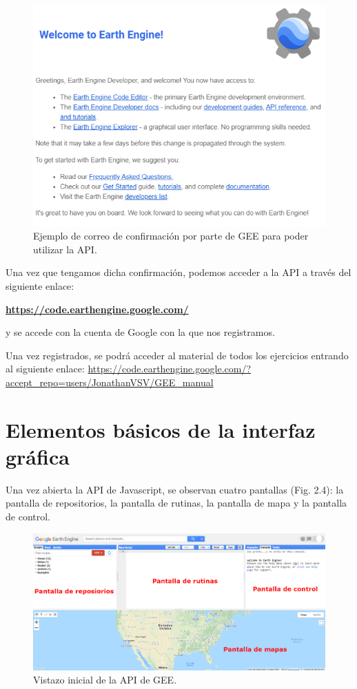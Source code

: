 \documentclass[
  12pt,
  letterpaper,
  twoside]{book}
\begin{document}
\begin{figure}[btp]

{\centering \includegraphics[width=0.6\linewidth]{Img/correo} 

}

\caption{Ejemplo de correo de confirmación por parte de GEE para poder utilizar la API.}\label{fig:unnamed-chunk-4}
\end{figure}

Una vez que tengamos dicha confirmación, podemos acceder a la API a través del siguiente enlace:

\textbf{\url{https://code.earthengine.google.com/}}

y se accede con la cuenta de Google con la que nos registramos.

Una vez registrados, se podrá acceder al material de todos los ejercicios entrando al siguiente enlace: \url{https://code.earthengine.google.com/?accept_repo=users/JonathanVSV/GEE_manual}

\hypertarget{elementos-buxe1sicos-de-la-interfaz-gruxe1fica}{%
\section{Elementos básicos de la interfaz gráfica}\label{elementos-buxe1sicos-de-la-interfaz-gruxe1fica}}

Una vez abierta la API de Javascript, se observan cuatro pantallas (Fig. 2.4): la pantalla de repositorios, la pantalla de rutinas, la pantalla de mapa y la pantalla de control.

\begin{figure}[btp]

{\centering \includegraphics[width=1\linewidth]{Img/GEE_inicio_API2} 

}

\caption{Vistazo inicial de la API de GEE.}\label{fig:unnamed-chunk-5}
\end{figure}
\end{document}
